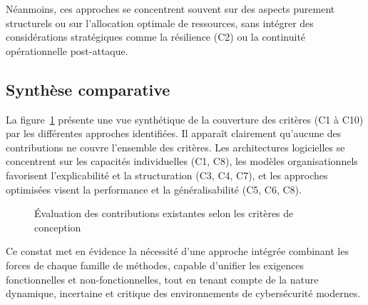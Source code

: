 \documentclass[ twoside,openright,titlepage,numbers=noenddot,headinclude,%
                footinclude=true,cleardoublepage=empty,abstractoff, %
                BCOR=5mm,paper=a4,fontsize=11pt,%
                french,american,%
                ]{scrreprt}
\begin{document}
Néanmoins, ces approches se concentrent souvent sur des aspects purement structurels ou sur l'allocation optimale de ressources, sans intégrer des considérations stratégiques comme la résilience (C2) ou la continuité opérationnelle post-attaque.

\subsection*{Synthèse comparative}

La figure~\ref{fig:revue-couverture-criteres} présente une vue synthétique de la couverture des critères (C1 à C10) par les différentes approches identifiées. Il apparaît clairement qu'aucune des contributions ne couvre l'ensemble des critères. Les architectures logicielles se concentrent sur les capacités individuelles (C1, C8), les modèles organisationnels favorisent l'explicabilité et la structuration (C3, C4, C7), et les approches optimisées visent la performance et la généralisabilité (C5, C6, C8).

\begin{figure}[h]
    \centering
    \caption{Évaluation des contributions existantes selon les critères de conception}
    \label{fig:revue-couverture-criteres}
\end{figure}

Ce constat met en évidence la nécessité d'une approche intégrée combinant les forces de chaque famille de méthodes, capable d'unifier les exigences fonctionnelles et non-fonctionnelles, tout en tenant compte de la nature dynamique, incertaine et critique des environnements de cybersécurité modernes.
\end{document}
